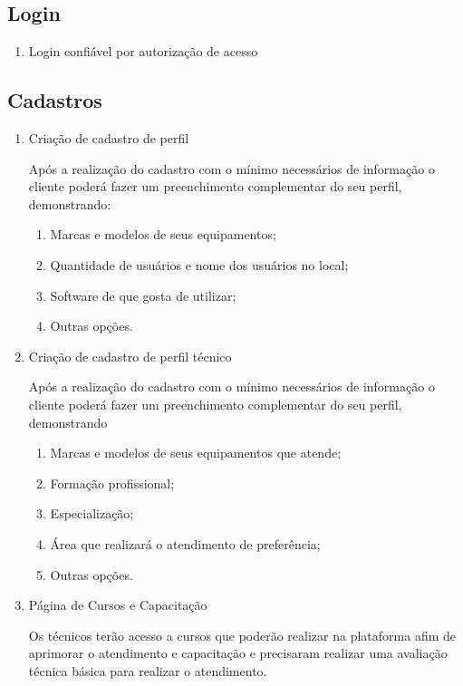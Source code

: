 \subsection{Login}

\begin{enumerate}
	\item Login confiável por autorização de acesso
\end{enumerate}

\subsection{Cadastros}

\begin{enumerate}
	\item Criação de cadastro de perfil
	
	Após a realização do cadastro com o mínimo necessários de informação o cliente poderá fazer um preenchimento complementar do seu perfil, demonstrando:
	
	\begin{enumerate}
		\item Marcas e modelos de seus equipamentos;
		\item Quantidade de usuários e nome dos usuários no local;
		\item Software de que gosta de utilizar;
		\item Outras opções.
	\end{enumerate}
	
	\item Criação de cadastro de perfil técnico
	
	Após a realização do cadastro com o mínimo necessários de informação o cliente poderá fazer um preenchimento complementar do seu perfil, demonstrando
	
	\begin{enumerate}
		
		\item Marcas e modelos de seus equipamentos que atende;
		\item Formação profissional;
		\item Especialização;
		\item Área que realizará o atendimento de preferência;
		\item Outras opções. 
		
	\end{enumerate}
	
	\item Página de Cursos e Capacitação
	
	Os técnicos terão acesso a cursos que poderão realizar na plataforma afim de aprimorar o atendimento e capacitação e precisaram realizar uma avaliação técnica básica para realizar o atendimento.
	
\end{enumerate}

